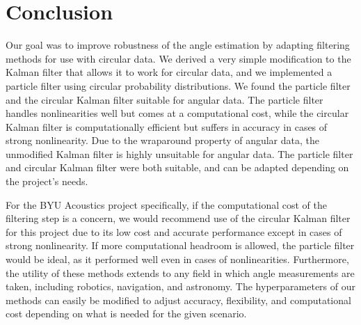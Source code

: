 \documentclass[11pt]{amsart}
\begin{document}
\section{Conclusion}
Our goal was to improve robustness of the angle estimation by adapting filtering methods for use with circular data. We derived a very simple modification to the Kalman filter that 
allows it to work for circular data, and we implemented a particle filter using circular probability distributions. We found the particle filter and the circular Kalman filter suitable 
for angular data. The particle filter handles nonlinearities well but comes at a computational cost, while the circular Kalman filter is computationally efficient but suffers in 
accuracy in cases of strong nonlinearity. Due to the wraparound property of angular data, the unmodified Kalman filter is highly unsuitable for angular data. The particle 
filter and circular Kalman filter were both suitable, and can be adapted depending on the project’s needs.

For the BYU Acoustics project specifically, if the computational cost of the filtering step is a concern, we would recommend use of the circular Kalman filter for this project due to its low 
cost and accurate performance except in cases of strong nonlinearity. If more computational headroom is allowed, the particle filter would be ideal, as it performed well even in cases of 
nonlinearities. Furthermore, the utility of these methods extends to any field in which angle measurements are taken, including robotics, navigation, and astronomy. The hyperparameters of our 
methods can easily be modified to adjust accuracy, flexibility, and computational cost depending on what is needed for the given scenario. 




\FloatBarrier %
\newpage

\end{document}
